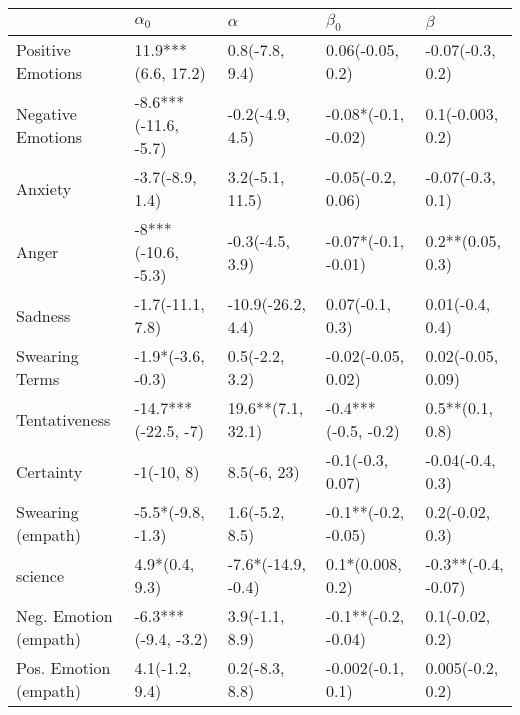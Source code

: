 \begin{tabular}{lllll}
\toprule
{} &            $\alpha_0$ &            $\alpha$ &            $\beta_0$ &              $\beta$ \\
\midrule
Positive Emotions     &    11.9***(6.6, 17.2) &      0.8(-7.8, 9.4) &     0.06(-0.05, 0.2) &     -0.07(-0.3, 0.2) \\
Negative Emotions     &  -8.6***(-11.6, -5.7) &     -0.2(-4.9, 4.5) &  -0.08*(-0.1, -0.02) &     0.1(-0.003, 0.2) \\
Anxiety               &       -3.7(-8.9, 1.4) &     3.2(-5.1, 11.5) &    -0.05(-0.2, 0.06) &     -0.07(-0.3, 0.1) \\
Anger                 &    -8***(-10.6, -5.3) &     -0.3(-4.5, 3.9) &  -0.07*(-0.1, -0.01) &     0.2**(0.05, 0.3) \\
Sadness               &      -1.7(-11.1, 7.8) &   -10.9(-26.2, 4.4) &      0.07(-0.1, 0.3) &      0.01(-0.4, 0.4) \\
Swearing Terms        &     -1.9*(-3.6, -0.3) &      0.5(-2.2, 3.2) &   -0.02(-0.05, 0.02) &    0.02(-0.05, 0.09) \\
Tentativeness         &   -14.7***(-22.5, -7) &   19.6**(7.1, 32.1) &  -0.4***(-0.5, -0.2) &      0.5**(0.1, 0.8) \\
Certainty             &            -1(-10, 8) &         8.5(-6, 23) &     -0.1(-0.3, 0.07) &     -0.04(-0.4, 0.3) \\
Swearing (empath)     &     -5.5*(-9.8, -1.3) &      1.6(-5.2, 8.5) &  -0.1**(-0.2, -0.05) &      0.2(-0.02, 0.3) \\
science               &        4.9*(0.4, 9.3) &  -7.6*(-14.9, -0.4) &     0.1*(0.008, 0.2) &  -0.3**(-0.4, -0.07) \\
Neg. Emotion (empath) &   -6.3***(-9.4, -3.2) &      3.9(-1.1, 8.9) &  -0.1**(-0.2, -0.04) &      0.1(-0.02, 0.2) \\
Pos. Emotion (empath) &        4.1(-1.2, 9.4) &      0.2(-8.3, 8.8) &    -0.002(-0.1, 0.1) &     0.005(-0.2, 0.2) \\
\bottomrule
\end{tabular}
